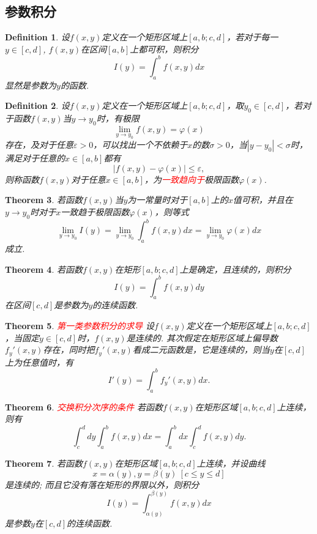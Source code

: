 \documentclass{article}
\newtheorem{theorem}{Theorem}[section]
\newtheorem{definition}[theorem]{Definition}
\newcommand{\redt}[1]{\textcolor{red}{#1}}
\begin{document}
\subsection{参数积分}

\begin{definition}
\rm 设$f(x,y)$定义在一个矩形区域上$[a,b;c,d]$，若对于每一$y \in [c,d]$, $f(x,y)$在区间$[a,b]$上都可积，则积分
$$
I(y) = \int_a^b f(x,y)dx
$$
显然是参数为$y$的函数. 
\end{definition}

\begin{definition}
\rm 设$f(x,y)$定义在一个矩形区域上$[a,b;c,d]$，取$y_0 \in [c,d]$，若对于函数$f(x,y)$当$y \to y_0$时，有极限
$$
\lim\limits_{y \to y_0} f(x,y) = \varphi(x)
$$
存在，及对于任意$\varepsilon > 0$，可以找出一个不依赖于$x$的数$\sigma > 0$，当$|y-y_0|< \sigma$时，满足对于任意的$x \in [a,b]$都有
$$
|f(x,y)-\varphi(x)|\leq \varepsilon,
$$
则称函数$f(x,y)$对于任意$x \in [a,b]$，为\redt{一致趋向于}极限函数$\varphi(x)$. 
\end{definition}

\begin{theorem}
\rm 若函数$f(x,y)$当$y$为一常量时对于$[a,b]$上的$x$值可积，并且在$y \to y_0$时对于$x$一致趋于极限函数$\varphi(x)$，则等式
$$
\lim\limits_{y \to y_0} I(y) = \lim\limits_{y \to y_0}\int_a^{b} f(x,y)dx = \lim\limits_{y \to y_0} \varphi(x)dx 
$$
成立.
\end{theorem}

\begin{theorem}
\rm 若函数$f(x,y)$在矩形$[a,b;c,d]$上是确定，且连续的，则积分
$$
I(y) = \int_a^b f(x,y)dy
$$
在区间$[c,d]$是参数为$y$的连续函数. 
\end{theorem}

\begin{theorem}
\rm \redt{第一类参数积分的求导} 设$f(x,y)$定义在一个矩形区域上$[a,b;c,d]$，当固定$y \in [c,d]$时，$f(x,y)$是连续的. 其次假定在矩形区域上偏导数$f_y'(x,y)$存在，同时把$f_y'(x,y)$看成二元函数是，它是连续的，则当$y$在$[c,d]$上为任意值时，有
$$
I'(y) = \int_a^b f_y'(x,y)dx.
$$
\end{theorem}

\begin{theorem}
\rm \redt{交换积分次序的条件} 若函数$f(x,y)$在矩形区域$[a,b;c,d]$上连续，则有
$$
\int_c^d dy \int_a^b f(x,y)dx = \int_a^b dx \int_c^d f(x,y)dy. 
$$
\end{theorem}

\begin{theorem}
\rm 若函数$f(x,y)$在矩形区域$[a,b;c,d]$上连续，并设曲线
$$
x=\alpha(y),y=\beta(y) ~ [c \leq y \leq d]
$$
是连续的; 而且它没有落在矩形的界限以外，则积分
$$
I(y) = \int_{\alpha(y)}^{\beta(y)} f(x,y)dx
$$
是参数$y$在$[c,d]$的连续函数. 
\end{theorem}
\end{document}
